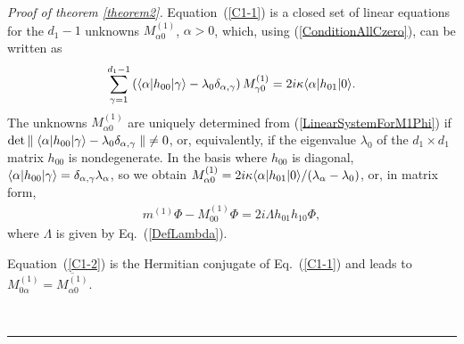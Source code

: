 \documentclass[aps,pra,letterpaper,twocolumn,showpacs,superscriptaddress,floatfix,longbibliography]{revtex4-1}
\newenvironment{proof}[1][Proof]{\noindent\textit{#1.} }{\
  \rule{0.5em}{0.5em}}
\begin{document}
\begin{proof}[Proof of theorem \ref{theorem2}]
  Equation~(\ref{C1-1}) is a closed set of linear equations for the
  $d_1-1$ unknowns $M^{(1)}_{\alpha 0}$, $\alpha>0$, which, using
  (\ref{ConditionAllCzero}), can be written as
  \begin{align}
    \sum_{\gamma=1}^{d_1-1} \left( \langle{\alpha}|h_{00}|{\gamma}\rangle -
      \lambda_0 \delta_{\alpha,\gamma} \right) M^{(1)}_{\gamma 0} = 2 i
    \kappa \langle{\alpha}|h_{01}|{0}\rangle.
    \label{LinearSystemForM1Phi}
  \end{align}
  The unknowns $M^{(1)}_{\alpha 0}$ are uniquely determined from
  (\ref{LinearSystemForM1Phi}) if $\det{\parallel
    \langle{\alpha}|h_{00}|{\gamma}\rangle  - \lambda_0
    \delta_{\alpha,\gamma} \parallel} \neq 0$, or, equivalently, if
  the eigenvalue $\lambda_0$ of the $d_1\times d_1$ matrix $h_{00}$ is
  nondegenerate. In the basis where $h_{00}$ is diagonal,
  $\langle{\alpha}|h_{00}|{\gamma}\rangle = \delta_{\alpha,\gamma}
  \lambda_\alpha$, so we obtain $M^{(1)}_{\alpha 0}= 2 i \kappa \langle{\alpha}|
  h_{01} |{0}\rangle/(\lambda_\alpha-\lambda_0)$, or, in matrix form,
  \begin{align}
    m^{(1)} \Phi - M^{(1)}_{0 0} \Phi = 2 i \Lambda h_{01} h_{10}
    \Phi,
    \label{ResM1PhiWithLambda}
  \end{align}
  where $\Lambda$ is given by Eq.~(\ref{DefLambda}).

  Equation~(\ref{C1-2}) is the Hermitian conjugate of Eq.~(\ref{C1-1})
  and leads to $M^{(1)}_{0 \alpha }= \overline{M^{(1)}_{\alpha 0}}$.


\end{proof}
\end{document}
